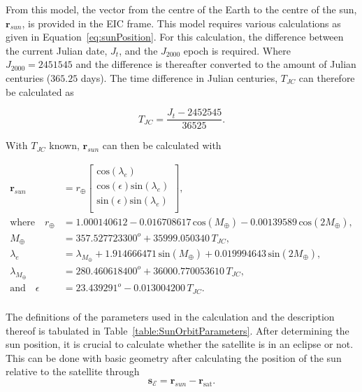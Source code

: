 From this model, the vector from the centre of the Earth to the centre of the sun, $\mathbf{r}_{sun}$, is provided in the EIC frame. This model requires various calculations as given in Equation~\ref{eq:sunPosition}. For this calculation, the difference between the current Julian date, $J_t$, and the $J_{2000}$ epoch is required. Where $J_{2000} = \num{2451545}$ and the difference is thereafter converted to the amount of Julian centuries ($\num{365.25}$ days). The time difference in Julian centuries, $T_{JC}$ can therefore be calculated as 

\begin{equation}
T_{JC} = \frac{J_t - \num{2452545}}{\num{36525}}.
\end{equation}

With $T_{JC}$ known, $\mathbf{r}_{sun}$ can then be calculated with

\begin{equation}
\label{eq:sunPosition}
	\begin{aligned}
		\mathbf{r}_{sun} &= r_{\oplus} \begin{bmatrix}
		\text{cos}(\lambda_e) \\ \text{cos}(\epsilon)\text{sin}(\lambda_e) \\ \text{sin}(\epsilon)\text{sin}(\lambda_e) \\
		\end{bmatrix}, \\
		\text{where} \quad r_{\oplus} &= \num{1.000140612} - \num{0.016708617} \, \text{cos}(M_{\oplus}) - \num{0.00139589} \, \text{cos}(2M_{\oplus}), \\
		M_{\oplus} &= \num{357.527723300}^o + \num{35999.050340} \, T_{JC}, \\
		\lambda_e &= \lambda_{M_{\oplus}} + \num{1.914666471} \, \text{sin}(M_{\oplus}) + \num{0.019994643} \, \text{sin}(2M_{\oplus}), \\
		\lambda_{M_{\oplus}} &= \num{280.460618400}^o + \num{36000.770053610} \, T_{JC}, \\
		\text{and} \quad \epsilon &= \num{23.439291}^o - \num{0.013004200} \, T_{JC}. \\
	\end{aligned}
\end{equation}

The definitions of the parameters used in the calculation and the description thereof is tabulated in Table~\ref{table:SunOrbitParameters}. After determining the sun position, it is crucial to calculate whether the satellite is in an eclipse or not. This can be done with basic geometry after calculating the position of the sun relative to the satellite through
\begin{equation}
\mathbf{s}_{\mathcal{E}} = \mathbf{r}_{sun} - \mathbf{r}_{\text{sat}}.
\end{equation}

